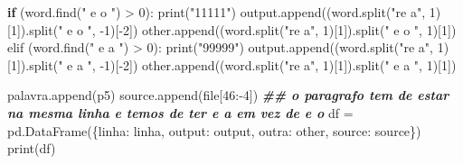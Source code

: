 \documentclass[
  12pt,
]{article}
\newenvironment{Shaded}{\begin{snugshade}}{\end{snugshade}}
\newcommand{\ControlFlowTok}[1]{\textcolor[rgb]{0.13,0.29,0.53}{\textbf{#1}}}
\newcommand{\DecValTok}[1]{\textcolor[rgb]{0.00,0.00,0.81}{#1}}
\newcommand{\DocumentationTok}[1]{\textcolor[rgb]{0.56,0.35,0.01}{\textbf{\textit{#1}}}}
\newcommand{\FunctionTok}[1]{\textcolor[rgb]{0.00,0.00,0.00}{#1}}
\newcommand{\NormalTok}[1]{#1}
\newcommand{\OtherTok}[1]{\textcolor[rgb]{0.56,0.35,0.01}{#1}}
\newcommand{\SpecialCharTok}[1]{\textcolor[rgb]{0.00,0.00,0.00}{#1}}
\newcommand{\StringTok}[1]{\textcolor[rgb]{0.31,0.60,0.02}{#1}}
\begin{document}
\begin{Shaded}
\begin{Highlighting}[]
                            \ControlFlowTok{if}\NormalTok{ (}\FunctionTok{word.find}\NormalTok{(}\StringTok{" e o "}\NormalTok{) }\SpecialCharTok{\textgreater{}} \DecValTok{0}\NormalTok{)}\SpecialCharTok{:}
                                \FunctionTok{print}\NormalTok{(}\StringTok{"11111"}\NormalTok{)}
                                \FunctionTok{output.append}\NormalTok{((}\FunctionTok{word.split}\NormalTok{(}\StringTok{"re a"}\NormalTok{, }\DecValTok{1}\NormalTok{)[}\DecValTok{1}\NormalTok{])}\FunctionTok{.split}\NormalTok{(}\StringTok{" e o "}\NormalTok{, }\SpecialCharTok{{-}}\DecValTok{1}\NormalTok{)[}\SpecialCharTok{{-}}\DecValTok{2}\NormalTok{])}
                                \FunctionTok{other.append}\NormalTok{((}\FunctionTok{word.split}\NormalTok{(}\StringTok{"re a"}\NormalTok{, }\DecValTok{1}\NormalTok{)[}\DecValTok{1}\NormalTok{])}\FunctionTok{.split}\NormalTok{(}\StringTok{" e o "}\NormalTok{, }\DecValTok{1}\NormalTok{)[}\DecValTok{1}\NormalTok{])}
                            \FunctionTok{elif}\NormalTok{ (}\FunctionTok{word.find}\NormalTok{(}\StringTok{" e a "}\NormalTok{) }\SpecialCharTok{\textgreater{}} \DecValTok{0}\NormalTok{)}\SpecialCharTok{:}
                                \FunctionTok{print}\NormalTok{(}\StringTok{"99999"}\NormalTok{)}
                                \FunctionTok{output.append}\NormalTok{((}\FunctionTok{word.split}\NormalTok{(}\StringTok{"re a"}\NormalTok{, }\DecValTok{1}\NormalTok{)[}\DecValTok{1}\NormalTok{])}\FunctionTok{.split}\NormalTok{(}\StringTok{" e a "}\NormalTok{, }\SpecialCharTok{{-}}\DecValTok{1}\NormalTok{)[}\SpecialCharTok{{-}}\DecValTok{2}\NormalTok{])}
                                \FunctionTok{other.append}\NormalTok{((}\FunctionTok{word.split}\NormalTok{(}\StringTok{"re a"}\NormalTok{, }\DecValTok{1}\NormalTok{)[}\DecValTok{1}\NormalTok{])}\FunctionTok{.split}\NormalTok{(}\StringTok{" e a "}\NormalTok{, }\DecValTok{1}\NormalTok{)[}\DecValTok{1}\NormalTok{])}

                            \FunctionTok{palavra.append}\NormalTok{(p5)}
                            \FunctionTok{source.append}\NormalTok{(file[}\DecValTok{46}\SpecialCharTok{:{-}}\DecValTok{4}\NormalTok{])}
\DocumentationTok{\#\# o paragrafo tem de estar na mesma linha e temos de ter \textquotesingle{}e a\textquotesingle{} em vez de \textquotesingle{}e o\textquotesingle{}}
\NormalTok{df }\OtherTok{=} \FunctionTok{pd.DataFrame}\NormalTok{(\{}\StringTok{\textquotesingle{}linha\textquotesingle{}}\SpecialCharTok{:}\NormalTok{ linha, }\StringTok{\textquotesingle{}output\textquotesingle{}}\SpecialCharTok{:}\NormalTok{ output,}
                   \StringTok{\textquotesingle{}outra\textquotesingle{}}\SpecialCharTok{:}\NormalTok{ other, }\StringTok{\textquotesingle{}source\textquotesingle{}}\SpecialCharTok{:}\NormalTok{ source\})}
\FunctionTok{print}\NormalTok{(df)}


\end{Highlighting}
\end{Shaded}
\end{document}
